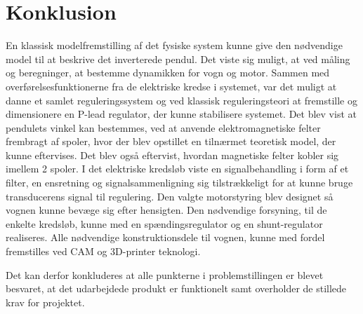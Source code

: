 \chapter{Konklusion} \label{kap:konklusion}
En klassisk modelfremstilling af det fysiske system kunne give den nødvendige model til at beskrive det inverterede pendul.
Det viste sig muligt, at ved måling og beregninger, at bestemme dynamikken for vogn og motor.
Sammen med overførelsesfunktionerne fra de elektriske kredse i systemet, var det muligt at danne et samlet reguleringssystem og ved klassisk reguleringsteori at fremstille og dimensionere en P-lead regulator, der kunne stabilisere systemet.
Det blev vist at pendulets vinkel kan bestemmes, ved at anvende elektromagnetiske felter frembragt af spoler, hvor der blev opstillet en tilnærmet teoretisk model, der kunne eftervises.
Det blev også eftervist, hvordan magnetiske felter kobler sig imellem 2 spoler.
I det elektriske kredsløb viste en signalbehandling i form af et filter, en ensretning og signalsammenligning sig tilstrækkeligt for at kunne bruge transducerens signal til regulering.
Den valgte motorstyring blev designet så vognen kunne bevæge sig efter hensigten.
Den nødvendige forsyning, til de enkelte kredsløb, kunne med en spændingsregulator og en shunt-regulator realiseres.
Alle nødvendige konstruktionsdele til vognen, kunne med fordel fremstilles ved CAM og 3D-printer teknologi.

Det kan derfor konkluderes at alle punkterne i problemstillingen er blevet besvaret, at det udarbejdede produkt er funktionelt samt overholder de stillede krav for projektet. 